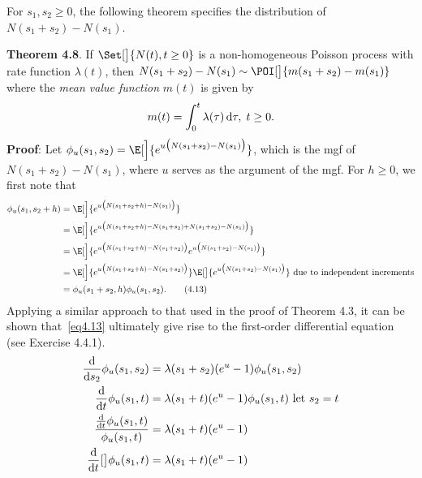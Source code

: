 For $ s_1,s_2\ge 0 $, the following theorem specifies the distribution of $ N(s_1+s_2)-N(s_1) $.
\begin{Result}
    \textbf{Theorem 4.8}. If $ \Set[\big]{N(t),t\ge 0} $ is a non-homogeneous Poisson process with rate function
    $ \lambda(t) $, then $ N(s_1+s_2)-N(s_1)\sim \POI[\big]{m(s_1+s_2)-m(s_1)} $ where the \emph{mean value function}
    $ m(t) $ is given by
    \[ m(t)=\int_{0}^{t}\lambda(\tau)\odif{\tau},\; t\ge 0. \]
    \tcblower{}
    \textbf{Proof}: Let $ \phi_u(s_1,s_2)=\E[\Big]{e^{u\bigl(N(s_1+s_2)-N(s_1)\bigr)}} $, which is the mgf of $ N(s_1+s_2)-N(s_1) $,
    where $ u $ serves as the argument of the mgf. For $ h\ge 0 $, we first note that
    \begin{align*}
        \phi_u(s_1,s_2+h)
         & =\E[\Big]{e^{u\bigl(N(s_1+s_2+h)-N(s_1)\bigr)}}                                                                                      \\
         & =\E[\Big]{e^{u\bigl(N(s_1+s_2+h)-N(s_1+s_2)+N(s_1+s_2)-N(s_1)\bigr)}}                                                                \\
         & =\E[\Big]{e^{u\bigl(N(s_1+s_2+h)-N(s_1+s_2)\bigr)}e^{u\bigl(N(s_1+s_2)-N(s_1)\bigr)}}                                                \\
         & =\E[\Big]{e^{u\bigl(N(s_1+s_2+h)-N(s_1+s_2)\bigr)}}\E[\big]{e^{u\bigl(N(s_1+s_2)-N(s_1)\bigr)}}\text{ due to independent increments} \\
         & =\phi_u(s_1+s_2,h)\phi_u(s_1,s_2).\label{eq4.13}\tag*{(4.13)}
    \end{align*}
    Applying a similar approach to that used in the proof of Theorem 4.3, it can be shown that~\ref{eq4.13} ultimately give rise
    to the first-order differential equation (see Exercise 4.4.1).
    \begin{align*}
        \odv*{\phi_u(s_1,s_2)}{s_2}
                                                             & =\lambda(s_1+s_2)(e^u-1)\phi_u(s_1,s_2)                \\
        \odv*{\phi_u(s_1,t)}{t}
                                                             & =\lambda(s_1+t)(e^u-1)\phi_u(s_1,t)\text{ let $s_2=t$} \\
        \frac{\odv*{\phi_u(s_1,t)}{t}}{\phi_u(s_1,t)}        & =\lambda(s_1+t)(e^u-1)                                 \\
        \odv*{\ln[\big]{\phi_u(s_1,t)}}{t}                   & =\lambda(s_1+t)(e^u-1)                                 \\

\end{align*}
\end{Result}
